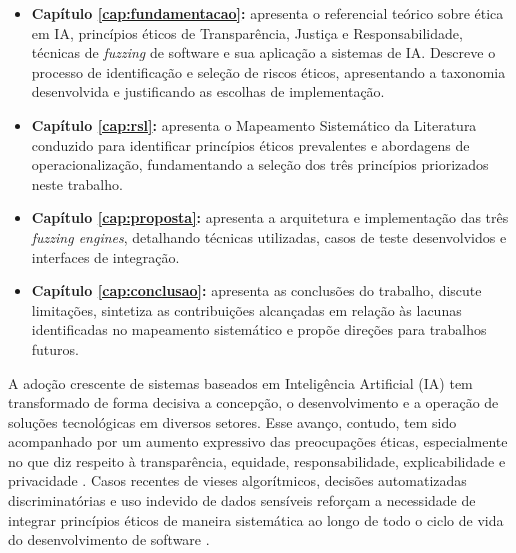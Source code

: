 \begin{itemize}
    \item \textbf{Capítulo \ref{cap:fundamentacao}:} apresenta o referencial teórico sobre ética em IA, princípios éticos de Transparência, Justiça e Responsabilidade, técnicas de \textit{fuzzing} de software e sua aplicação a sistemas de IA. Descreve o processo de identificação e seleção de riscos éticos, apresentando a taxonomia desenvolvida e justificando as escolhas de implementação.
    
    \item \textbf{Capítulo \ref{cap:rsl}:} apresenta o Mapeamento Sistemático da Literatura conduzido para identificar princípios éticos prevalentes e abordagens de operacionalização, fundamentando a seleção dos três princípios priorizados neste trabalho.
    
    
    \item \textbf{Capítulo \ref{cap:proposta}:} apresenta a arquitetura e implementação das três \textit{fuzzing engines}, detalhando técnicas utilizadas, casos de teste desenvolvidos e interfaces de integração.
    
    \item \textbf{Capítulo \ref{cap:conclusao}:} apresenta as conclusões do trabalho, discute limitações, sintetiza as contribuições alcançadas em relação às lacunas identificadas no mapeamento sistemático e propõe direções para trabalhos futuros.
\end{itemize}

\label{cap:rsl}

A adoção crescente de sistemas baseados em Inteligência Artificial (IA) tem transformado de forma decisiva a concepção, o desenvolvimento e a operação de soluções tecnológicas em diversos setores. Esse avanço, contudo, tem sido acompanhado por um aumento expressivo das preocupações éticas, especialmente no que diz respeito à transparência, equidade, responsabilidade, explicabilidade e privacidade \cite{Floridi2018, Jobin2019, Ryan2020, S058}. Casos recentes de vieses algorítmicos, decisões automatizadas discriminatórias e uso indevido de dados sensíveis reforçam a necessidade de integrar princípios éticos de maneira sistemática ao longo de todo o ciclo de vida do desenvolvimento de software \cite{Mittelstadt2019, Hagendorff2020, S058,Reddy2024}.


